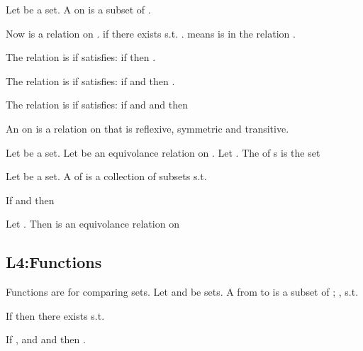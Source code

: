 \begin{D} Let  be a set. A  on  is a subset of . \end{D}

Now \e{$<$} is a relation on .  if there exists  s.t. .  means  is in the relation \e{$<$}.

\begin{D} The relation \e{$\sim$} is  if \e{$\sim$} satisfies: if  then . \end{D}
\begin{D} The relation \e{$\sim$} is  if \e{$\sim$} satisfies: if  and  then . \end{D}
\begin{D} The relation \e{$\sim$} is  if \e{$\sim$} satisfies: if  and  and  then  \end{D}

\begin{D} An  on  is a relation on  that is reflexive, symmetric and transitive. \end{D}

\begin{D} Let  be a set. Let \e{$\sim$} be an equivolance relation on . Let . The  of s is the set  \end{D}

\begin{D} Let  be a set. A  of  is a collection  of subsets  s.t. \begin{compactitem}
\item {}
\item If  and  then 
\end{compactitem}
\end{D}

\begin{T} Let . Then  is an equivolance relation on  \end{T}


\subsection{L4:Functions}
Functions are for comparing sets. Let  and  be sets. A  from to  is a subset  of ; , s.t. \begin{compactitem}
\item If  then there exists  s.t. 
\item If , and  and  then .\end{compactitem}

